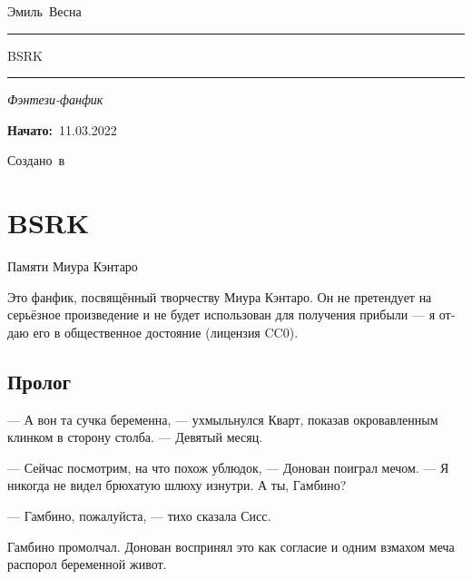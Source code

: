 \documentclass[a4paper,12pt,fleqn]{book}\usepackage{polyglossia}\setdefaultlanguage[babelshorthands=true]{russian}\setotherlanguage{english}\defaultfontfeatures{Ligatures=TeX,Mapping=tex-text}\usepackage{xcolor}\newcommand{\ml}[3]{#2}
\newcommand{\tofaauthor}{\ml{$0$}{Эмиль~Весна}{Emil~Viesn\'{a}}}
\newcommand{\tofatitle}{\ml{$0$}{BSRK}{BSRK}}
\newcommand{\tofastarted}{11.03.2022}
\newcommand{\asterism}{\vspace{1em}{\centering\Large\bfseries$\ast~\ast~\ast$\par}\vspace{1em}}
\begin{document}
 

\begin{titlepage}
{\centering{~\par}\vspace{0.25\textheight}
{\LARGE\tofaauthor}\par
\vspace{1.0cm}\rule{17em}{1pt}\par\vspace{0.3cm}
{\Huge\textsc{\tofatitle}\par}
\vspace{0.3cm}\rule{17em}{2pt}\par\vspace{1.0cm}
{\Large\textit{\ml{$0$}{Фэнтези-фанфик}{Fantasy fanfiction}}\par}
\vspace{0.5cm}\asterism\par\vspace{1.0cm}
{\textbf{\ml{$0$}{Начато:}{Started:}}~\tofastarted\par}\vfill
{\Large\ml{$0$}{Создано~в}{Created~by}~\XeLaTeX}\par}
\end{titlepage}

\tableofcontents

\chapter{BSRK}

Памяти Миура Кэнтаро

Это фанфик, посвящённый творчеству Миура Кэнтаро.
Он не претендует на серьёзное произведение и не будет использован для получения прибыли --- я отдаю его в общественное достояние (лицензия CC0).

\section{Пролог}

--- А вон та сучка беременна, --- ухмыльнулся Кварт, показав окровавленным клинком в сторону столба.
--- Девятый месяц.

--- Сейчас посмотрим, на что похож ублюдок, --- Донован поиграл мечом.
--- Я никогда не видел брюхатую шлюху изнутри.
А ты, Гамбино?

--- Гамбино, пожалуйста, --- тихо сказала Сисс.

Гамбино промолчал.
Донован воспринял это как согласие и одним взмахом меча распорол беременной живот.
\end{document}
